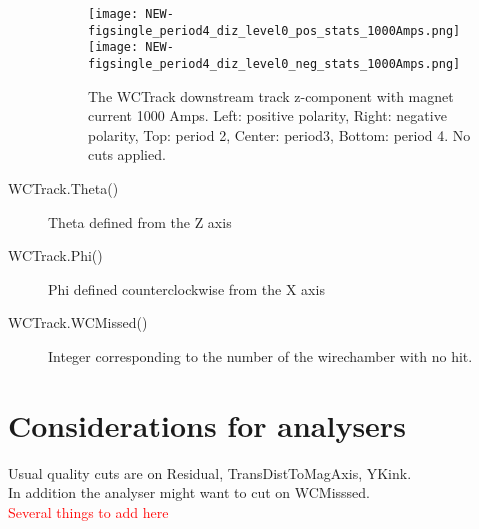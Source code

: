 \begin{description}
{\begin{figure}[h]
 	\texttt{[image: NEW-figsingle\_period4\_diz\_level0\_pos\_stats\_1000Amps.png]}
	 \texttt{[image: NEW-figsingle\_period4\_diz\_level0\_neg\_stats\_1000Amps.png]}
   \caption[short]{The WCTrack downstream track z-component with magnet current 1000 Amps. Left: positive polarity, Right: negative polarity, Top: period 2, Center: period3,  Bottom: period 4. No cuts applied.}
   \label{fig_diz}
  \end{figure}
  
}
\item[WCTrack.Theta()]{
Theta defined from the Z axis 
}
\item[WCTrack.Phi()]{
Phi defined counterclockwise from the X axis 
}

        

         
\item[WCTrack.WCMissed()]{
Integer corresponding to the number of the wirechamber with no hit.
}
\end{description}
 

 
  \section{Considerations for analysers}
  
  Usual quality cuts are on Residual, TransDistToMagAxis, YKink.\\
  
  In addition the analyser might want to cut on WCMisssed.\\
  
  \textcolor{red}{Several things to add here}


